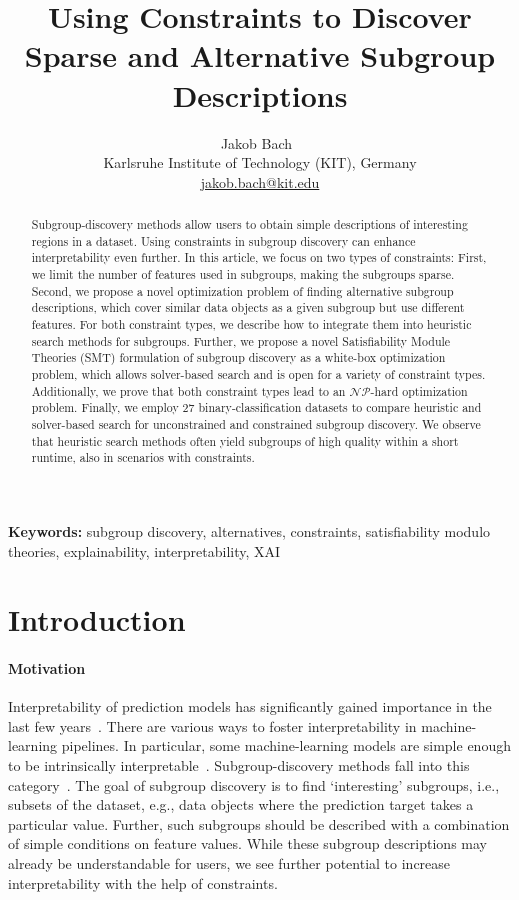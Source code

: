 \documentclass{article}
\title{
	Using Constraints to Discover Sparse and Alternative Subgroup Descriptions
}
\author{
	Jakob Bach~\orcidlink{0000-0003-0301-2798}\\
	\small Karlsruhe Institute of Technology (KIT), Germany\\
	\small \href{mailto:jakob.bach@kit.edu}{jakob.bach@kit.edu}
}
\date{} %
\theoremstyle{definition}
\begin{document}
\maketitle

\begin{abstract}
Subgroup-discovery methods allow users to obtain simple descriptions of interesting regions in a dataset.
Using constraints in subgroup discovery can enhance interpretability even further.
In this article, we focus on two types of constraints:
First, we limit the number of features used in subgroups, making the subgroups sparse.
Second, we propose a novel optimization problem of finding alternative subgroup descriptions, which cover similar data objects as a given subgroup but use different features.
For both constraint types, we describe how to integrate them into heuristic search methods for subgroups.
Further, we propose a novel Satisfiability Module Theories (SMT) formulation of subgroup discovery as a white-box optimization problem, which allows solver-based search and is open for a variety of constraint types.
Additionally, we prove that both constraint types lead to an $\mathcal{NP}$-hard optimization problem.
Finally, we employ 27 binary-classification datasets to compare heuristic and solver-based search for unconstrained and constrained subgroup discovery.
We observe that heuristic search methods often yield subgroups of high quality within a short runtime, also in scenarios with constraints.
\end{abstract}
%
\textbf{Keywords:} subgroup discovery, alternatives, constraints, satisfiability modulo theories, explainability, interpretability, XAI

\section{Introduction}
\label{sec:csd:introduction}

\paragraph{Motivation}

Interpretability of prediction models has significantly gained importance in the last few years~\cite{carvalho2019machine, molnar2020interpretable}.
There are various ways to foster interpretability in machine-learning pipelines.
In particular, some machine-learning models are simple enough to be intrinsically interpretable~\cite{carvalho2019machine}.
Subgroup-discovery methods fall into this category~\cite{atzmueller2015subgroup}.
The goal of subgroup discovery is to find `interesting' subgroups, i.e., subsets of the dataset, e.g., data objects where the prediction target takes a particular value.
Further, such subgroups should be described with a combination of simple conditions on feature values.
While these subgroup descriptions may already be understandable for users, we see further potential to increase interpretability with the help of constraints.
\end{document}
